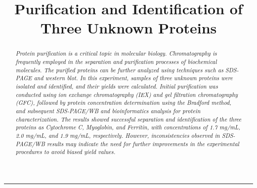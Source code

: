 \documentclass[a4paper,10pt]{article}
\title{Purification and Identification of Three Unknown Proteins}
\author{}
\date{}
\begin{document}
\maketitle


\setlength{\absleftindent}{0pt}
\setlength{\absrightindent}{0pt}
\setlength{\abstitleskip}{-1.5em}
\abslabeldelim{:}
\renewcommand{\abstractnamefont}{\itshape\bfseries}
\renewcommand{\absnamepos}{flushleft}


\begin{abstract}
\textit{\small Protein purification is a critical topic in molecular biology. Chromatography is frequently employed in the separation and purification processes of biochemical molecules. The purified proteins can be further analyzed using techniques such as SDS-PAGE and western blot. In this experiment, samples of three unknown proteins were isolated and identified, and their yields were calculated. Initial purification was conducted using ion exchange chromatography (IEX) and gel filtration chromatography (GFC), followed by protein concentration determination using the Bradford method, and subsequent SDS-PAGE/WB and bioinformatics analysis for protein characterization. The results showed successful separation and identification of the three proteins as Cytochrome C, Myoglobin, and Ferritin, with concentrations of 1.7 mg/mL, 2.0 mg/mL, and 1.9 mg/mL, respectively. However, inconsistencies observed in SDS-PAGE/WB results may indicate the need for further improvements in the experimental procedures to avoid biased yield values. }
\end{abstract}


\hrule
\end{document}
